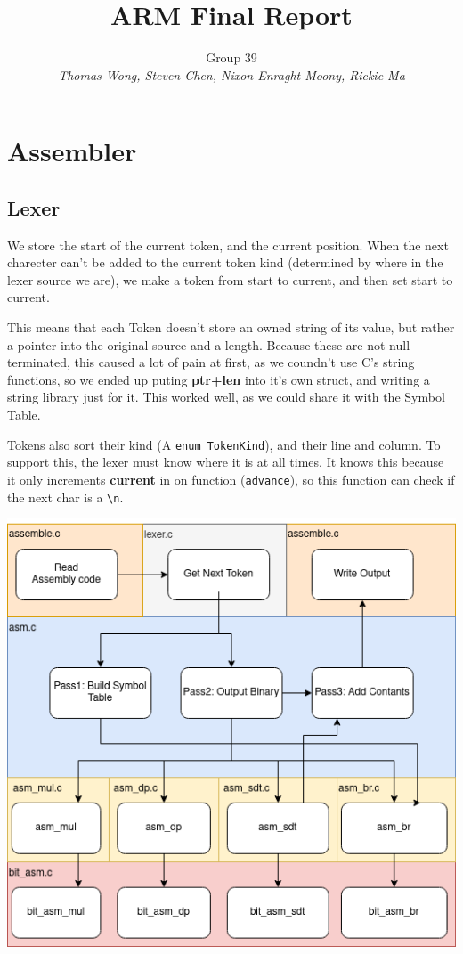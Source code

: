 \documentclass[11pt, a4paper]{article}
\begin{document}
\title{\vspace{-2cm}ARM Final Report}
\author{Group 39\\ \small \textit{Thomas Wong, Steven Chen, Nixon Enraght-Moony, Rickie Ma}}

\maketitle
\section{Assembler}
\subsection{Lexer}
We store the start of the current token, and the
current position. When the next charecter can't be added to the current token
kind (determined by where in the lexer source we are), we make a token from 
start to current, and then set start to current.
\par
This means that each Token doesn't store an owned string of its value, but
rather a pointer into the original source and a length. Because these are not
null terminated, this caused a lot of pain at first, as we coundn't use C's
string functions, so we ended up puting \textbf{ptr+len} into it's own struct, and
writing a string library just for it. This worked well, as we could share it 
with the Symbol Table.
\par
Tokens also sort their kind (A \texttt{enum TokenKind}), and their line and
column. To support this, the lexer must know where it is at all times. It knows
this because it only increments \textbf{current} in on function (\texttt{advance}), so
this function can check if the next char is a
\texttt{\textquotesingle{}\textbackslash{}n\textquotesingle{}}.

\begin{center}
  \includegraphics[scale=0.4]{report/asm_arch.png}
\end{center}
\end{document}
